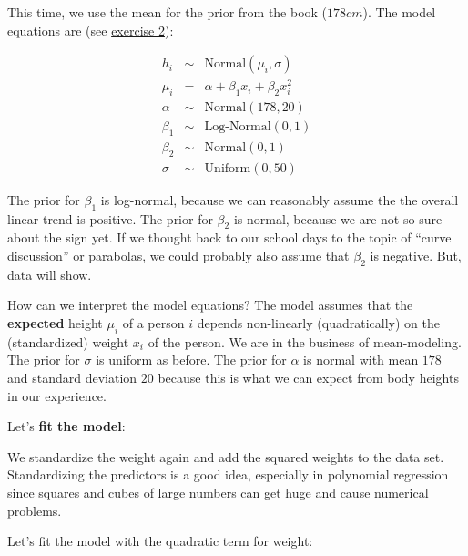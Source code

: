 \documentclass[
]{book}
\begin{document}
This time, we use the mean for the prior from the book (\(178 cm\)).
The model equations are (see \hyperref[exercise2_multiple_regression]{exercise 2}):

\begin{eqnarray*}
h_i &\sim& \text{Normal}(\mu_i, \sigma) \\
\mu_i &=& \alpha + \beta_1 x_i + \beta_2 x_i^2 \\
\alpha &\sim& \text{Normal}(178, 20) \\
\beta_1 &\sim& \text{Log-Normal}(0, 1) \\
\beta_2 &\sim& \text{Normal}(0, 1) \\
\sigma &\sim& \text{Uniform}(0, 50)
\end{eqnarray*}

The prior for \(\beta_1\) is log-normal, because we can reasonably assume
the the overall linear trend is positive.
The prior for \(\beta_2\) is normal, because
we are not so sure about the sign yet. If we thought back to our school days to the topic of
``curve discussion'' or parabolas, we could probably also assume that \(\beta_2\) is negative.
But, data will show.

How can we interpret the model equations?
The model assumes that the \textbf{expected} height \(\mu_i\) of a person \(i\)
depends non-linearly (quadratically) on the (standardized) weight \(x_i\) of the person.
We are in the business of mean-modeling.
The prior for \(\sigma\) is uniform as before.
The prior for \(\alpha\) is normal with mean \(178\) and standard deviation \(20\)
because this is what we can expect from body heights in our experience.

Let's \textbf{fit the model}:

We standardize the weight again and add the squared weights to the data set.
Standardizing the predictors is a good idea, especially in polynomial regression
since squares and cubes of large numbers can get huge and cause numerical problems.

Let's fit the model with the quadratic term for weight:
\end{document}
